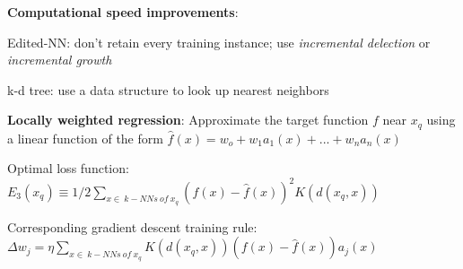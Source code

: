 \documentclass[letterpaper,fontsize=5pt]{scrartcl}
\renewenvironment{enumerate}[1]{\begin{compactenum}#1}{\end{compactenum}}
\theoremstyle{definition}
\begin{document}
\begin{multicols}{2}
\begin{enumerate}
		\item \textbf{Computational speed improvements}:
			\begin{enumerate}
				\item Edited-NN: don't retain every training instance; use \emph{incremental delection} or \emph{incremental growth}
				\item k-d tree: use a data structure to look up nearest neighbors
			\end{enumerate}
		\item \textbf{Locally weighted regression}: Approximate the target function $f$ near $x_q$ using a linear function of the form $\hat{f}(x) = w_o + w_1 a_1(x) + ... + w_n a_n(x)$
			\begin{enumerate}
				\item Optimal loss function: $E_3(x_q) \equiv 1/2 \sum\limits_{x\in\:k-NNs\:of\:x_q} (f(x)-\hat{f}(x))^2 K(d(x_q,x))$
				\item Corresponding gradient descent training rule:\\ $\Delta w_j = \eta \sum\limits_{x\in\:k-NNs\:of\:x_q} K(d(x_q,x))(f(x) - \hat{f}(x)) a_j(x)$
			\end{enumerate}
	\end{enumerate}

\end{multicols}
\end{document}
